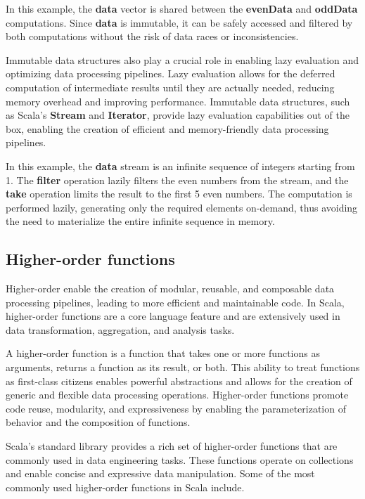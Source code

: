 

In this example, the \textbf{data} vector is shared between the \textbf{evenData} and \textbf{oddData} computations. Since \textbf{data} is immutable, it can be safely accessed and filtered by both computations without the risk of data races or inconsistencies.

Immutable data structures also play a crucial role in enabling lazy evaluation and optimizing data processing pipelines. Lazy evaluation allows for the deferred computation of intermediate results until they are actually needed, reducing memory overhead and improving performance. Immutable data structures, such as Scala's \textbf{Stream} and \textbf{Iterator}, provide lazy evaluation capabilities out of the box, enabling the creation of efficient and memory-friendly data processing pipelines.



In this example, the \textbf{data} stream is an infinite sequence of integers starting from 1. The \textbf{filter} operation lazily filters the even numbers from the stream, and the \textbf{take} operation limits the result to the first 5 even numbers. The computation is performed lazily, generating only the required elements on-demand, thus avoiding the need to materialize the entire infinite sequence in memory.

\subsection{Higher-order functions}

Higher-order enable the creation of modular, reusable, and composable data processing pipelines, leading to more efficient and maintainable code. In Scala, higher-order functions are a core language feature and are extensively used in data transformation, aggregation, and analysis tasks.

A higher-order function is a function that takes one or more functions as arguments, returns a function as its result, or both. This ability to treat functions as first-class citizens enables powerful abstractions and allows for the creation of generic and flexible data processing operations. Higher-order functions promote code reuse, modularity, and expressiveness by enabling the parameterization of behavior and the composition of functions.

Scala's standard library provides a rich set of higher-order functions that are commonly used in data engineering tasks. These functions operate on collections and enable concise and expressive data manipulation. Some of the most commonly used higher-order functions in Scala include.

